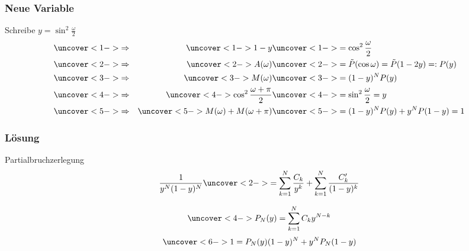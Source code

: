%
%
\begin{frame}
\frametitle{Neue Variable}
\begin{block}{Schreibe $y=\sin^2\frac{\omega}2$}
\vspace{-20pt}
\begin{align}
&\uncover<1->{\Rightarrow}&
\uncover<1->{1-y}&\uncover<1->{= \cos^2\frac{\omega}2}
\notag
\\
&\uncover<2->{\Rightarrow}&
\uncover<2->{A(\omega)}&\uncover<2->{=\tilde{P}(\cos\omega)=\tilde{P}(1-2y)=:P(y)}
\notag
\\
&\uncover<3->{\Rightarrow}&
\uncover<3->{M(\omega)}&\uncover<3->{=(1-y)^N P(y)}
\notag
\\
&\uncover<4->{\Rightarrow}&
\uncover<4->{\cos^2\frac{\omega+\pi}2}&\uncover<4->{=\sin^2\frac{\omega}2=y}
\notag
\\
&\uncover<5->{\Rightarrow}&
\uncover<5->{M(\omega)+M(\omega+\pi)}&\uncover<5->{= (1-y)^N P(y) + y^N P(1-y) = 1}
\label{algcond}
\end{align}
\end{block}
\end{frame}

%
%
%
\begin{frame}
\frametitle{Lösung}
\begin{block}{Partialbruchzerlegung}
\[
\frac{1}{y^N(1-y)^N}
\uncover<2->{=
\sum_{k=1}^N \frac{\mathstrut C_k}{\mathstrut y^k}
+
\sum_{k=1}^N \frac{\mathstrut C_k'}{\mathstrut (1-y)^k}
}
\]
\end{block}
\[
\uncover<4->{P_N(y) = \sum_{k=1}^N C_ky^{N-k}}
\]
\[
\uncover<6->{1=
P_N(y) (1-y)^N + y^N P_N(1-y)}
\]
\end{frame}
